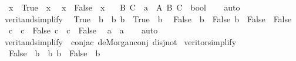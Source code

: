 \begin{isabellebody}
\ \ {\isacartoucheopen}x\ {\isasymand}\ True\ {\isasymlongleftrightarrow}\ x{\isacartoucheclose}\isanewline
\ \ {\isacartoucheopen}x\ {\isasymor}\ False\ {\isasymlongleftrightarrow}\ x{\isacartoucheclose}\isanewline
\ \ \ B\ C\ {\isacharcolon}{\kern0pt}{\isacharcolon}{\kern0pt}\ {\isacharprime}{\kern0pt}a\ \ A{\isacharprime}{\kern0pt}\ B{\isacharprime}{\kern0pt}\ C{\isacharprime}{\kern0pt}\ {\isacharcolon}{\kern0pt}{\isacharcolon}{\kern0pt}\ bool\isanewline
%
\isadelimproof
\ \ %
\endisadelimproof
%
\isatagproof
{}\isamarkupfalse%
\ auto%
\endisatagproof
{\isafoldproof}%
%
\isadelimproof
\isanewline
%
\endisadelimproof
\isanewline
{}\isamarkupfalse%
\ verit{\isacharunderscore}{\kern0pt}and{\isacharunderscore}{\kern0pt}simplify{}{\isacharcolon}{\kern0pt}\isanewline
\ \ {\isacartoucheopen}True\ {\isasymand}\ b\ {\isasymlongleftrightarrow}\ b{\isacartoucheclose}\ {\isacartoucheopen}b\ {\isasymand}\ True\ {\isasymlongleftrightarrow}\ b{\isacartoucheclose}\isanewline
\ \ {\isacartoucheopen}False\ {\isasymand}\ b\ {\isasymlongleftrightarrow}\ False{\isacartoucheclose}\ {\isacartoucheopen}b\ {\isasymand}\ False\ {\isasymlongleftrightarrow}\ False{\isacartoucheclose}\isanewline
\ \ {\isacartoucheopen}{\isacharparenleft}{\kern0pt}c\ {\isasymand}\ {\isasymnot}c{\isacharparenright}{\kern0pt}\ {\isasymlongleftrightarrow}\ False{\isacartoucheclose}\ {\isacartoucheopen}{\isacharparenleft}{\kern0pt}{\isasymnot}c\ {\isasymand}\ c{\isacharparenright}{\kern0pt}\ {\isasymlongleftrightarrow}\ False{\isacartoucheclose}\isanewline
\ \ {\isacartoucheopen}{\isasymnot}{\isasymnot}a\ {\isacharequal}{\kern0pt}\ a{\isacartoucheclose}\isanewline
%
\isadelimproof
\ \ %
\endisadelimproof
%
\isatagproof
{}\isamarkupfalse%
\ auto%
\endisatagproof
{\isafoldproof}%
%
\isadelimproof
\isanewline
%
\endisadelimproof
\isanewline
{}\isamarkupfalse%
\ verit{\isacharunderscore}{\kern0pt}and{\isacharunderscore}{\kern0pt}simplify\ {\isacharequal}{\kern0pt}\ conj{\isacharunderscore}{\kern0pt}ac\ de{\isacharunderscore}{\kern0pt}Morgan{\isacharunderscore}{\kern0pt}conj\ disj{\isacharunderscore}{\kern0pt}not{}\isanewline
\isanewline
\isanewline
{}\isamarkupfalse%
\ verit{\isacharunderscore}{\kern0pt}or{\isacharunderscore}{\kern0pt}simplify{\isacharunderscore}{\kern0pt}{}{\isacharcolon}{\kern0pt}\isanewline
\ \ {\isacartoucheopen}False\ {\isasymor}\ b\ {\isasymlongleftrightarrow}\ b{\isacartoucheclose}\ {\isacartoucheopen}b\ {\isasymor}\ False\ {\isasymlongleftrightarrow}\ b{\isacartoucheclose}\isanewline

\end{isabellebody}
